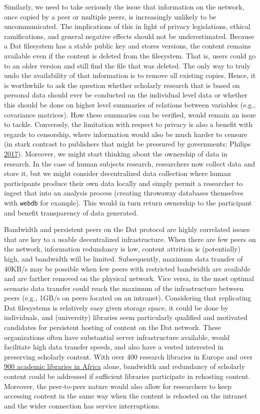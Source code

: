 \documentclass[a5paper]{book}
\begin{document}
Similarly, we need to take seriously the issue that information on the
network, once copied by a peer or multiple peers, is increasingly
unlikely to be uncommunicated. The implications of this in light of
privacy legislations, ethical ramifications, and general negative
effects should not be underestimated. Because a Dat filesystem has a
stable public key and stores versions, the content remains available
even if the content is deleted from the filesystem. That is, users could
go to an older version and still find the file that was deleted. The
only way to truly undo the availability of that information is to remove
all existing copies. Hence, it is worthwhile to ask the question whether
scholarly research that is based on personal data should ever be
conducted on the individual level data or whether this should be done on
higher level summaries of relations between variables (e.g., covariance
matrices). How these summaries can be verified, would remain an issue to
tackle. Conversely, the limitation with respect to privacy is also a
benefit with regards to censorship, where information would also be much
harder to censure (in stark contrast to publishers that might be
pressured by governments; Philips
\protect\hyperlink{ref-guardian-cup}{2017}). Moreover, we might start
thinking about the ownership of data in research. In the case of human
subjects research, researchers now collect data and store it, but we
might consider decentralized data collection where human participants
produce their own data locally and simply permit a researcher to ingest
that into an analysis process (creating throwaway databases themselves
with \texttt{webdb} for example). This would in turn return ownership to
the participant and benefit transparency of data generated.

Bandwidth and persistent peers on the Dat protocol are highly correlated
issues that are key to a usable decentralized infrastructure. When there
are few peers on the network, information redundancy is low, content
attrition is (potentially) high, and bandwidth will be limited.
Subsequently, maximum data transfer of 40KB/s may be possible when few
peers with restricted bandwidth are available and are farther removed on
the physical network. Vice versa, in the most optimal scenario data
transfer could reach the maximum of the infrastructure between peers
(e.g., 1GB/s on peers located on an intranet). Considering that
replicating Dat filesystems is relatively easy given storage space, it
could be done by individuals, and (university) libraries seem
particularly qualified and motivated candidates for persistent hosting
of content on the Dat network. These organizations often have
substantial server infrastructure available, would facilitate high data
transfer speeds, and also have a vested interested in preserving
scholarly content. With over 400 research libraries in Europe and over
\href{http://db.aflia.net/list/?q=6\&m=n}{900 academic libraries in
Africa} alone, bandwidth and redundancy of scholarly content could be
addressed if sufficient libraries participate in rehosting content.
Moreover, the peer-to-peer nature would also allow for researchers to
keep accessing content in the same way when the content is rehosted on
the intranet and the wider connection has service interruptions.
\end{document}
